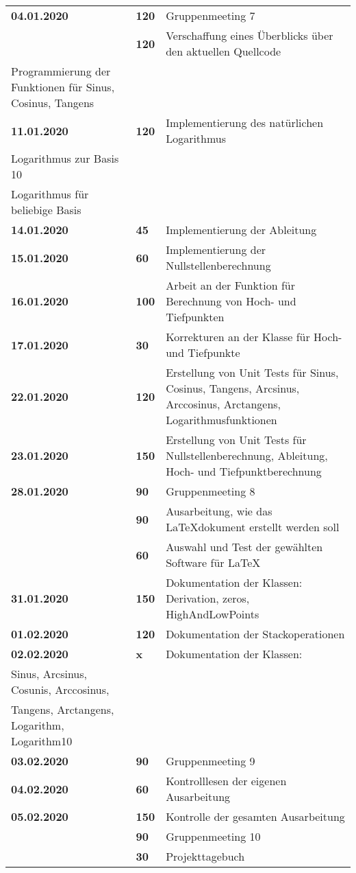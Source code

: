 {\begin{longtable}{|l|l|p{11cm}|}
		\\ \hline \textbf{04.01.2020}
			& \textbf{\hfill 120} & Gruppenmeeting 7 \\\cline{2-3}
			& \textbf{\hfill 120} & Verschaffung eines Überblicks über den aktuellen Quellcode\\Programmierung der Funktionen für Sinus, Cosinus, Tangens
		\\ \hline \textbf{11.01.2020}
			& \textbf{\hfill 120} & Implementierung des natürlichen Logarithmus\\Logarithmus zur Basis 10\\Logarithmus für beliebige Basis
		\\ \hline \textbf{14.01.2020}
			& \textbf{\hfill 45} & Implementierung der Ableitung 
		\\ \hline \textbf{15.01.2020}
			& \textbf{\hfill 60} & Implementierung der Nullstellenberechnung 
		\\ \hline \textbf{16.01.2020}
			& \textbf{\hfill 100} & Arbeit an der Funktion für Berechnung von Hoch- und Tiefpunkten
		\\ \hline \textbf{17.01.2020}
			& \textbf{\hfill 30} & Korrekturen an der Klasse für Hoch- und Tiefpunkte
		\\ \hline \textbf{22.01.2020}
			& \textbf{\hfill 120} & Erstellung von Unit Tests für Sinus, Cosinus, Tangens, Arcsinus, Arccosinus, Arctangens, Logarithmusfunktionen
		\\ \hline \textbf{23.01.2020}
			& \textbf{\hfill 150} & Erstellung von Unit Tests für Nullstellenberechnung, Ableitung, Hoch- und Tiefpunktberechnung
		\\ \hline \textbf{28.01.2020}
			& \textbf{\hfill 90} & Gruppenmeeting 8 \\\cline{2-3}
			& \textbf{\hfill 90} & Ausarbeitung, wie das LaTeXdokument erstellt werden soll \\\cline{2-3}
			& \textbf{\hfill 60} & Auswahl und Test der gewählten Software für LaTeX
		\\ \hline \textbf{31.01.2020}
			& \textbf{\hfill 150} & Dokumentation der Klassen: Derivation, zeros, HighAndLowPoints
		\\ \hline \textbf{01.02.2020}
			& \textbf{\hfill 120} & Dokumentation der Stackoperationen 
		\\ \hline \textbf{02.02.2020}
			& \textbf{\hfill x} & Dokumentation der Klassen:\\Sinus, Arcsinus, Cosunis, Arccosinus,\\Tangens, Arctangens, Logarithm, Logarithm10
		\\ \hline \textbf{03.02.2020}
			& \textbf{\hfill 90} & Gruppenmeeting 9
		\\ \hline \textbf{04.02.2020}
			& \textbf{\hfill 60} & Kontrolllesen der eigenen Ausarbeitung 
		\\ \hline \textbf{05.02.2020}
			& \textbf{\hfill 150} & Kontrolle der gesamten Ausarbeitung \\\cline{2-3}
			& \textbf{\hfill 90} & Gruppenmeeting 10 \\\cline{2-3}
			& \textbf{\hfill 30} & Projekttagebuch \\
		\hline\hline
	\end{longtable}
}

